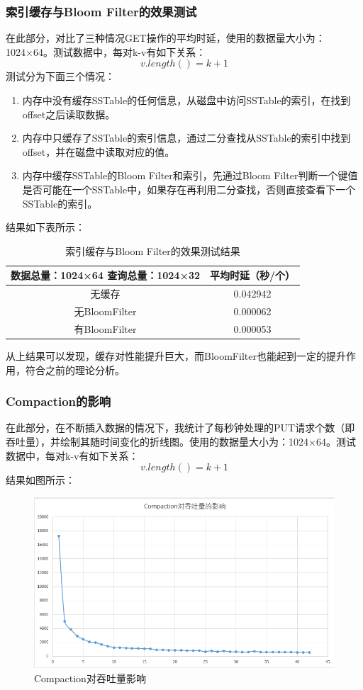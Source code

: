 \documentclass[UTF8]{ctexart}
\begin{document}
\subsubsection{索引缓存与Bloom Filter的效果测试}
在此部分，对比了三种情况GET操作的平均时延，使用的数据量大小为：1024×64。测试数据中，每对k-v有如下关系：
$$v.length()=k+1$$
测试分为下面三个情况：
\begin{enumerate}
    \item 内存中没有缓存SSTable的任何信息，从磁盘中访问SSTable的索引，在找到offset之后读取数据。
    \item 内存中只缓存了SSTable的索引信息，通过二分查找从SSTable的索引中找到offset，并在磁盘中读取对应的值。
    \item 内存中缓存SSTable的Bloom Filter和索引，先通过Bloom Filter判断一个键值是否可能在一个SSTable中，如果存在再利用二分查找，否则直接查看下一个SSTable的索引。
\end{enumerate}
结果如下表所示：
\begin{table}[h]
    \centering
    \begin{tabular}{|c|c|}
        \hline
        数据总量：1024×64 查询总量：1024×32&	平均时延（秒/个）\\
        \hline
        无缓存&	        0.042942\\
        \hline
        无BloomFilter&	0.000062\\
        \hline
        有BloomFilter&	0.000053\\
        \hline
    \end{tabular}
    \caption{索引缓存与Bloom Filter的效果测试结果}
\end{table}

从上结果可以发现，缓存对性能提升巨大，而BloomFilter也能起到一定的提升作用，符合之前的理论分析。
\subsubsection{Compaction的影响}
在此部分，在不断插入数据的情况下，我统计了每秒钟处理的PUT请求个数（即吞吐量），并绘制其随时间变化的折线图。使用的数据量大小为：1024×64。测试数据中，每对k-v有如下关系：
$$v.length()=k+1$$
结果如图所示：
\begin{figure}[h]
    \centering
    \includegraphics[scale=0.5]{Compaction对吞吐量影响.png}
    \caption{Compaction对吞吐量影响}
\end{figure}
\end{document}
